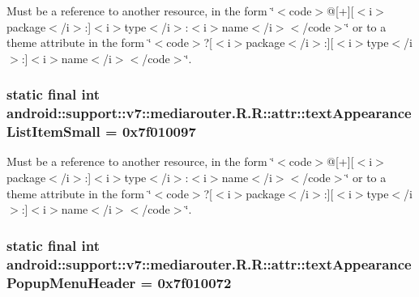 Must be a reference to another resource, in the form \char`\"{}$<$code$>$@\mbox{[}+\mbox{]}\mbox{[}$<$i$>$package$<$/i$>$:\mbox{]}$<$i$>$type$<$/i$>$:$<$i$>$name$<$/i$>$$<$/code$>$\char`\"{} or to a theme attribute in the form \char`\"{}$<$code$>$?\mbox{[}$<$i$>$package$<$/i$>$:\mbox{]}\mbox{[}$<$i$>$type$<$/i$>$:\mbox{]}$<$i$>$name$<$/i$>$$<$/code$>$\char`\"{}. \hypertarget{classandroid_1_1support_1_1v7_1_1mediarouter_1_1_r_1_1attr_d75c2f8f97a2fdf53a736d883fb39efd}{
\subsubsection[{textAppearanceListItemSmall}]{\setlength{\rightskip}{0pt plus 5cm}static final int android::support::v7::mediarouter.R.R::attr::textAppearanceListItemSmall = 0x7f010097}}
\label{classandroid_1_1support_1_1v7_1_1mediarouter_1_1_r_1_1attr_d75c2f8f97a2fdf53a736d883fb39efd}


Must be a reference to another resource, in the form \char`\"{}$<$code$>$@\mbox{[}+\mbox{]}\mbox{[}$<$i$>$package$<$/i$>$:\mbox{]}$<$i$>$type$<$/i$>$:$<$i$>$name$<$/i$>$$<$/code$>$\char`\"{} or to a theme attribute in the form \char`\"{}$<$code$>$?\mbox{[}$<$i$>$package$<$/i$>$:\mbox{]}\mbox{[}$<$i$>$type$<$/i$>$:\mbox{]}$<$i$>$name$<$/i$>$$<$/code$>$\char`\"{}. \hypertarget{classandroid_1_1support_1_1v7_1_1mediarouter_1_1_r_1_1attr_caba9147e66ecaf2fbdbb8b374a930d7}{
\subsubsection[{textAppearancePopupMenuHeader}]{\setlength{\rightskip}{0pt plus 5cm}static final int android::support::v7::mediarouter.R.R::attr::textAppearancePopupMenuHeader = 0x7f010072}}
\label{classandroid_1_1support_1_1v7_1_1mediarouter_1_1_r_1_1attr_caba9147e66ecaf2fbdbb8b374a930d7}


